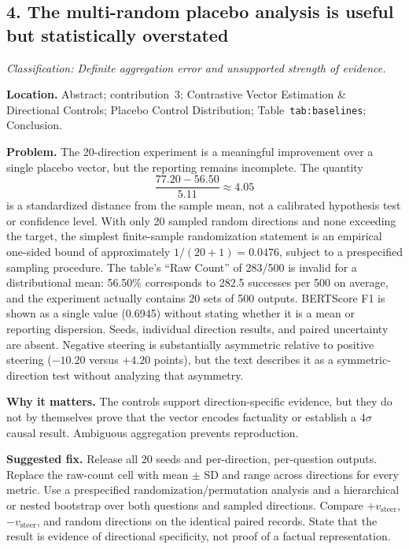 \documentclass[11pt]{article}
\newcommand{\findinglabel}[1]{\textbf{#1}}
\newcommand{\classification}[1]{\textit{Classification: #1.}}
\begin{document}
\subsection*{4. The multi-random placebo analysis is useful but statistically overstated}

\classification{Definite aggregation error and unsupported strength of evidence}

\findinglabel{Location.} Abstract; contribution~3; Contrastive Vector Estimation \& Directional Controls; Placebo Control Distribution; Table~\texttt{tab:baselines}; Conclusion.

\findinglabel{Problem.} The 20-direction experiment is a meaningful improvement over a single placebo vector, but the reporting remains incomplete.  The quantity
\[
\frac{77.20-56.50}{5.11}\approx4.05
\]
is a standardized distance from the sample mean, not a calibrated hypothesis test or confidence level.  With only 20 sampled random directions and none exceeding the target, the simplest finite-sample randomization statement is an empirical one-sided bound of approximately $1/(20+1)=0.0476$, subject to a prespecified sampling procedure.  The table's ``Raw Count'' of 283/500 is invalid for a distributional mean: 56.50\% corresponds to 282.5 successes per 500 on average, and the experiment actually contains 20 sets of 500 outputs.  BERTScore F1 is shown as a single value (0.6945) without stating whether it is a mean or reporting dispersion.  Seeds, individual direction results, and paired uncertainty are absent.  Negative steering is substantially asymmetric relative to positive steering ($-10.20$ versus $+4.20$ points), but the text describes it as a symmetric-direction test without analyzing that asymmetry.

\findinglabel{Why it matters.} The controls support direction-specific evidence, but they do not by themselves prove that the vector encodes factuality or establish a $4\sigma$ causal result.  Ambiguous aggregation prevents reproduction.

\findinglabel{Suggested fix.} Release all 20 seeds and per-direction, per-question outputs.  Replace the raw-count cell with mean $\pm$ SD and range across directions for every metric.  Use a prespecified randomization/permutation analysis and a hierarchical or nested bootstrap over both questions and sampled directions.  Compare $+v_{\text{steer}}$, $-v_{\text{steer}}$, and random directions on the identical paired records.  State that the result is evidence of directional specificity, not proof of a factual representation.
\end{document}
